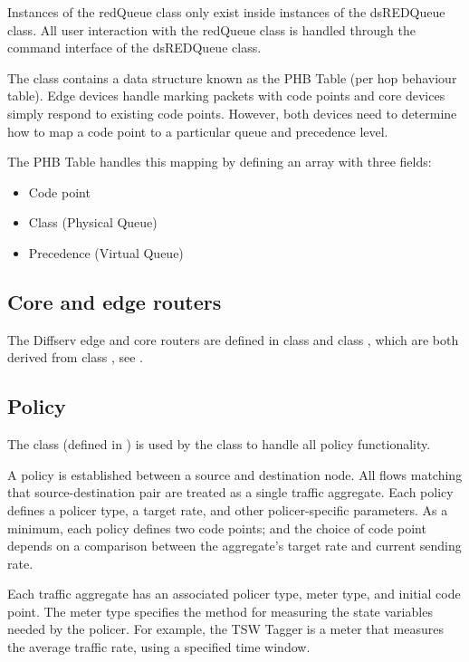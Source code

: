Instances of the redQueue class only exist inside instances of the dsREDQueue class.  All user interaction with the redQueue class is handled through the command interface of the dsREDQueue class.

The  class contains a data structure known as the PHB Table 
(per hop behaviour table).  Edge devices handle marking packets with code points
 and core devices simply respond to existing code points.  However, both devices
 need to determine how to map a code point to a particular queue and precedence 
level.

The PHB Table handles this mapping by defining an array with three fields:
\begin{itemize}
\item
Code point
\item
Class (Physical Queue)
\item
Precedence (Virtual Queue)
\end{itemize}


\subsection{Core and edge routers}
\label{sec:dsedge}
The Diffserv edge and core routers are defined in class  and 
class , which are both derived from class ,
see .

\subsection{Policy}
\label{sec:dspolicy}
The class  (defined in ) is used by the 
class  to handle all policy functionality.

A policy is established between a source and destination node.  All flows 
matching that source-destination pair are treated as a single traffic aggregate.
Each policy defines a policer type, a target rate, and other policer-specific 
parameters.  As a minimum, each policy defines two code points; and the choice 
of code point depends on a comparison between the aggregate's target rate and 
current sending rate.

Each traffic aggregate has an associated policer type, meter type, and initial 
code point.  The meter type specifies the method for measuring the state 
variables needed by the policer.  For example, the TSW Tagger is a meter that 
measures the average traffic rate, using a specified time window.

